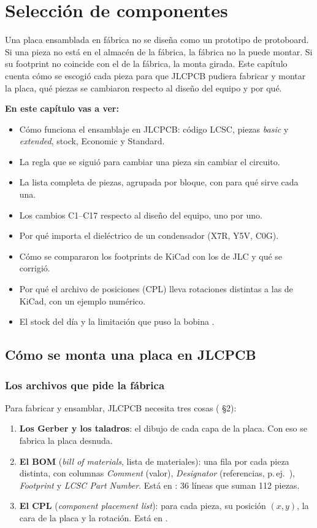 \chapter{Selección de componentes}\label{cap:piezas}

Una placa ensamblada en fábrica no se diseña como un prototipo de protoboard. Si una pieza no está en el almacén de la fábrica, la fábrica no la puede montar. Si su footprint no coincide con el de la fábrica, la monta girada. Este capítulo cuenta cómo se escogió cada pieza para que JLCPCB pudiera fabricar y montar la placa, qué piezas se cambiaron respecto al diseño del equipo y por qué.

\textbf{En este capítulo vas a ver:}
\begin{itemize}
  \item Cómo funciona el ensamblaje en JLCPCB: código LCSC, piezas \emph{basic} y \emph{extended}, stock, Economic y Standard.
  \item La regla que se siguió para cambiar una pieza sin cambiar el circuito.
  \item La lista completa de piezas, agrupada por bloque, con para qué sirve cada una.
  \item Los cambios C1--C17 respecto al diseño del equipo, uno por uno.
  \item Por qué importa el dieléctrico de un condensador (X7R, Y5V, C0G).
  \item Cómo se compararon los footprints de KiCad con los de JLC y qué se corrigió.
  \item Por qué el archivo de posiciones (CPL) lleva rotaciones distintas a las de KiCad, con un ejemplo numérico.
  \item El stock del día y la limitación que puso la bobina .
\end{itemize}

\section{Cómo se monta una placa en JLCPCB}\label{sec:c05-jlc}

\subsection{Los archivos que pide la fábrica}

Para fabricar y ensamblar, JLCPCB necesita tres cosas ( §2):
\begin{enumerate}
  \item \textbf{Los Gerber y los taladros}: el dibujo de cada capa de la placa. Con eso se fabrica la placa desnuda.
  \item \textbf{El BOM} (\emph{bill of materials}, lista de materiales): una fila por cada pieza distinta, con columnas \emph{Comment} (valor), \emph{Designator} (referencias, p.\,ej.\ ), \emph{Footprint} y \emph{LCSC Part Number}. Está en : 36 líneas que suman 112 piezas.
  \item \textbf{El CPL} (\emph{component placement list}): para cada pieza, su posición $(x,y)$, la cara de la placa y la rotación. Está en .
\end{enumerate}

